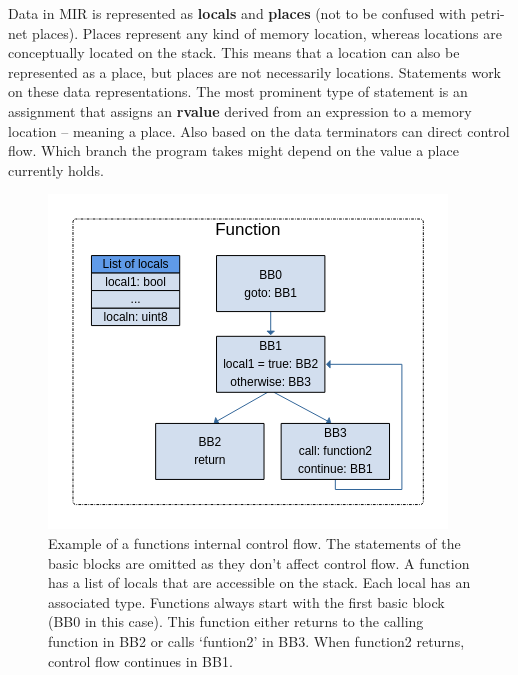 



Data in MIR is represented as \textbf{locals} and \textbf{places} (not to be confused with petri-net places).
Places represent any kind of memory location, whereas locations are conceptually located on the stack.
This means that a location can also be represented as a place, but places are not necessarily locations.
Statements work on these data representations.
The most prominent type of statement is an assignment that assigns an \textbf{rvalue} derived from an expression to a memory location -- meaning a place.
Also based on the data terminators can direct control flow.
Which branch the program takes might depend on the value a place currently holds.

\begin{figure}
    \centering
    \includegraphics[width=.7\textwidth]{../diagrams/Function.png}
    \caption{
        Example of a functions internal control flow.
        The statements of the basic blocks are omitted as they don't affect control flow.
        A function has a list of locals that are accessible on the stack.
        Each local has an associated type.
        Functions always start with the first basic block (BB0 in this case).
        This function either returns to the calling function in BB2
        or calls `funtion2' in BB3.
        When function2 returns, control flow continues in BB1.}
    \label{mir_fn}
\end{figure}

